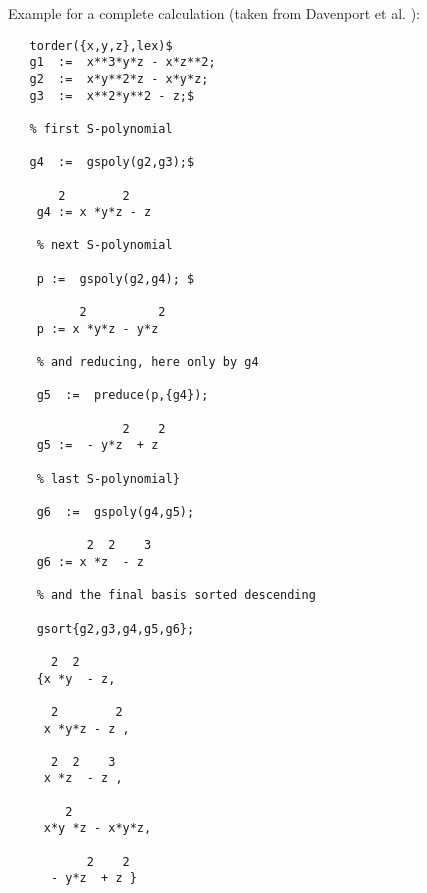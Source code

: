 Example for a complete calculation (taken from {\sc Davenport et al.}
 \cite{Davenport:88a}):
\begin{verbatim}
   torder({x,y,z},lex)$
   g1  :=  x**3*y*z - x*z**2;
   g2  :=  x*y**2*z - x*y*z;
   g3  :=  x**2*y**2 - z;$

   % first S-polynomial

   g4  :=  gspoly(g2,g3);$

       2        2
    g4 := x *y*z - z

    % next S-polynomial

    p :=  gspoly(g2,g4); $

          2          2
    p := x *y*z - y*z

    % and reducing, here only by g4

    g5  :=  preduce(p,{g4});

                2    2
    g5 :=  - y*z  + z

    % last S-polynomial}

    g6  :=  gspoly(g4,g5);

           2  2    3
    g6 := x *z  - z

    % and the final basis sorted descending

    gsort{g2,g3,g4,g5,g6};

      2  2
    {x *y  - z,

      2        2
     x *y*z - z ,

      2  2    3
     x *z  - z ,

        2
     x*y *z - x*y*z,

           2    2
      - y*z  + z }
 \end{verbatim}





